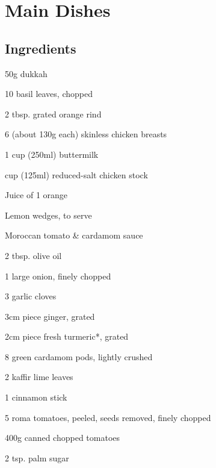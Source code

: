 \chapter{Main Dishes}
\section*{Ingredients}
\begin{ingredients-list}
	\item 50g dukkah
	\item 10 basil leaves, chopped
	\item 2 tbsp. grated orange rind
	\item 6 (about 130g each) skinless chicken breasts
	\item 1 cup (250ml) buttermilk
	\item {} cup (125ml) reduced-salt chicken stock
	\item Juice of 1 orange
	\item Lemon wedges, to serve
\end{ingredients-list}
Moroccan tomato \& cardamom sauce
\begin{ingredients-list}
	\item 2 tbsp. olive oil
	\item 1 large onion, finely chopped
	\item 3 garlic cloves
	\item 3cm piece ginger, grated
	\item 2cm piece fresh turmeric*, grated
	\item 8 green cardamom pods, lightly crushed
	\item 2 kaffir lime leaves
	\item 1 cinnamon stick
	\item 5 roma tomatoes, peeled, seeds removed, finely chopped
	\item 400g canned chopped tomatoes
	\item 2 tsp. palm sugar 
\end{ingredients-list}

